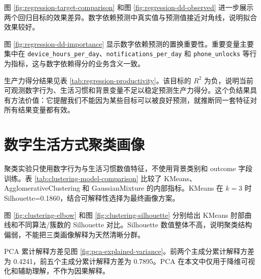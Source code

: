 

图 \ref{fig:regression-target-comparison} 和图 \ref{fig:regression-dd-observed} 进一步展示两个回归目标的效果差异。数字依赖预测中真实值与预测值接近对角线，说明拟合效果较好。



图 \ref{fig:regression-dd-importance} 显示数字依赖预测的置换重要性。重要变量主要集中在 \texttt{device\_hours\_per\_day}、\texttt{notifications\_per\_day} 和 \texttt{phone\_unlocks} 等行为指标，这与数字依赖得分的业务含义一致。


生产力得分结果见表 \ref{tab:regression-productivity}。该目标的 $R^2$ 为负，说明当前可观测数字行为、生活习惯和背景变量不足以稳定预测生产力得分。这个负结果具有方法价值：它提醒我们不能因为某些目标可以被良好预测，就推断同一套特征对所有结果变量都有效。



\section{数字生活方式聚类画像}

聚类实验只使用数字行为与生活习惯数值特征，不使用背景类别和 outcome 字段训练。表 \ref{tab:clustering-model-comparison} 比较了 KMeans、AgglomerativeClustering 和 GaussianMixture 的内部指标。KMeans 在 $k=3$ 时 Silhouette=0.1860，结合可解释性选择为最终画像方案。



图 \ref{fig:clustering-elbow} 和图 \ref{fig:clustering-silhouette} 分别给出 KMeans 肘部曲线和不同算法/簇数的 Silhouette 对比。Silhouette 数值整体不高，说明聚类结构偏弱，不能把三类画像解释为天然清晰分群。



PCA 累计解释方差见图 \ref{fig:pca-explained-variance}。前两个主成分累计解释方差为 0.4241，前五个主成分累计解释方差为 0.7895。PCA 在本文中仅用于降维可视化和辅助理解，不作为因果解释。

